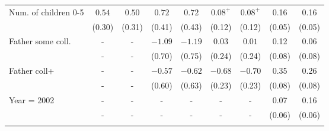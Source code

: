 \begin{tabular}{lcccccccc}
Num. of children 0-5&$0.54$&$0.50$&$0.72$&$0.72$&$0.08^{+}$&$0.08^{+}$&0.16&0.16\\
&(0.30)&(0.31)&(0.41)&(0.43)&(0.12)&(0.12)&(0.05)&(0.05)\\
Father some coll.&-&-&$-1.09$&$-1.19$&$0.03$&$0.01$&0.12&0.06\\
&-&-&(0.70)&(0.75)&(0.24)&(0.24)&(0.08)&(0.08)\\
Father coll+&-&-&$-0.57$&$-0.62$&$-0.68$&$-0.70$&0.35&0.26\\
&-&-&(0.60)&(0.63)&(0.23)&(0.23)&(0.08)&(0.08)\\
Year = 2002&-&-&-&-&-&-&0.07&0.16\\
&-&-&-&-&-&-&(0.06)&(0.06)\\
\\
\bottomrule\end{tabular}
